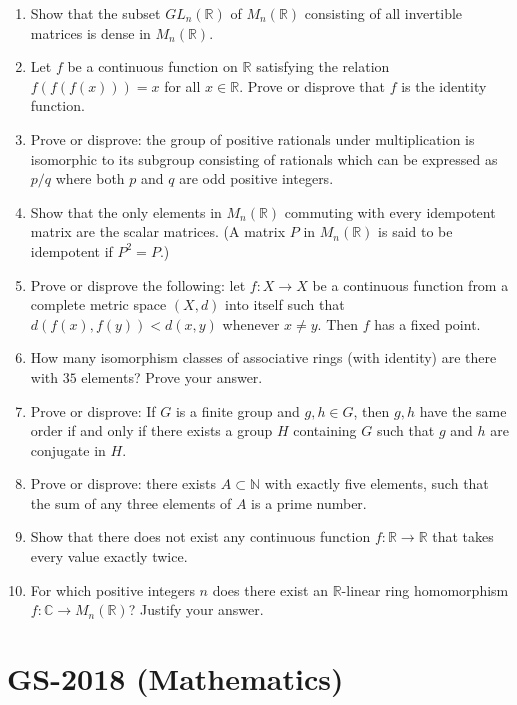 \documentclass[11pt, a4paper]{article}
\begin{document}
\begin{enumerate}
  \item Show that the subset $GL_n(\mathbb{R})$ of $M_n(\mathbb{R})$ consisting of all invertible matrices is dense in $M_n(\mathbb{R})$.
  \item Let $f$ be a continuous function on $\mathbb{R}$ satisfying the relation $f(f(f(x))) = x$ for all $x \in \mathbb{R}$. Prove or disprove that $f$ is the identity function.
  \item Prove or disprove: the group of positive rationals under multiplication is isomorphic to its subgroup consisting of rationals which can be expressed as $p/q$ where both $p$ and $q$ are odd positive integers.
  \item Show that the only elements in $M_n(\mathbb{R})$ commuting with every idempotent matrix are the scalar matrices. (A matrix $P$ in $M_n(\mathbb{R})$ is said to be idempotent if $P^2 = P$.)
  \item Prove or disprove the following: let $f: X \to X$ be a continuous function from a complete metric space $(X, d)$ into itself such that $d(f(x), f(y)) < d(x, y)$ whenever $x \ne y$. Then $f$ has a fixed point.
  \item How many isomorphism classes of associative rings (with identity) are there with $35$ elements? Prove your answer.
  \item Prove or disprove: If $G$ is a finite group and $g, h \in G$, then $g, h$ have the same order if and only if there exists a group $H$ containing $G$ such that $g$ and $h$ are conjugate in $H$.
  \item Prove or disprove: there exists $A \subset \mathbb{N}$ with exactly five elements, such that the sum of any three elements of $A$ is a prime number.
  \item Show that there does not exist any continuous function $f: \mathbb{R} \to \mathbb{R}$ that takes every value exactly twice.
  \item For which positive integers $n$ does there exist an $\mathbb{R}$-linear ring homomorphism $f: \mathbb{C} \to M_n(\mathbb{R})$? Justify your answer.
\end{enumerate}

\newpage

\section{GS-2018 (Mathematics)}
\end{document}

